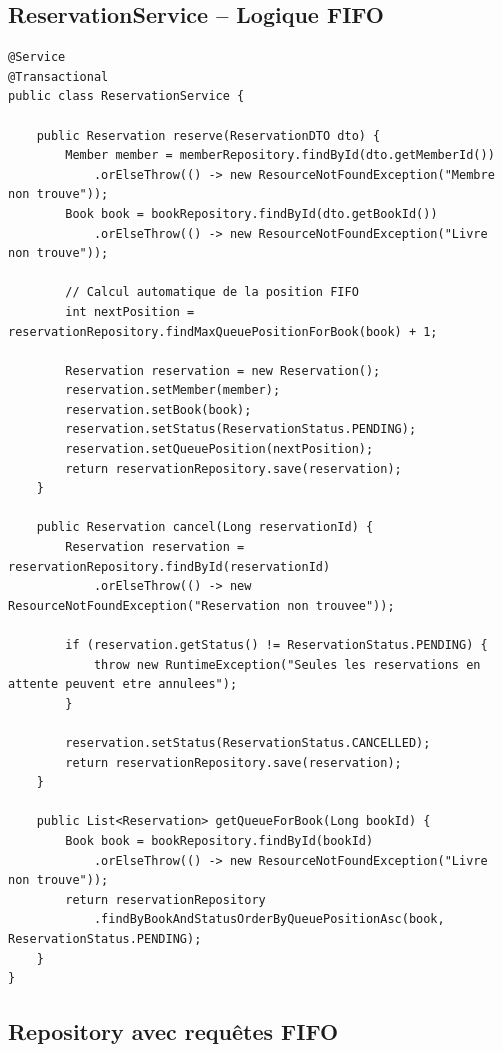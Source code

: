 \documentclass[12pt,a4paper,twoside]{report}
\begin{document}
\subsection{ReservationService -- Logique FIFO}

\begin{lstlisting}[caption=ReservationService avec file d'attente FIFO]
@Service
@Transactional
public class ReservationService {

    public Reservation reserve(ReservationDTO dto) {
        Member member = memberRepository.findById(dto.getMemberId())
            .orElseThrow(() -> new ResourceNotFoundException("Membre non trouve"));
        Book book = bookRepository.findById(dto.getBookId())
            .orElseThrow(() -> new ResourceNotFoundException("Livre non trouve"));

        // Calcul automatique de la position FIFO
        int nextPosition = reservationRepository.findMaxQueuePositionForBook(book) + 1;

        Reservation reservation = new Reservation();
        reservation.setMember(member);
        reservation.setBook(book);
        reservation.setStatus(ReservationStatus.PENDING);
        reservation.setQueuePosition(nextPosition);
        return reservationRepository.save(reservation);
    }

    public Reservation cancel(Long reservationId) {
        Reservation reservation = reservationRepository.findById(reservationId)
            .orElseThrow(() -> new ResourceNotFoundException("Reservation non trouvee"));

        if (reservation.getStatus() != ReservationStatus.PENDING) {
            throw new RuntimeException("Seules les reservations en attente peuvent etre annulees");
        }

        reservation.setStatus(ReservationStatus.CANCELLED);
        return reservationRepository.save(reservation);
    }

    public List<Reservation> getQueueForBook(Long bookId) {
        Book book = bookRepository.findById(bookId)
            .orElseThrow(() -> new ResourceNotFoundException("Livre non trouve"));
        return reservationRepository
            .findByBookAndStatusOrderByQueuePositionAsc(book, ReservationStatus.PENDING);
    }
}
\end{lstlisting}

\subsection{Repository avec requêtes FIFO}
\end{document}

